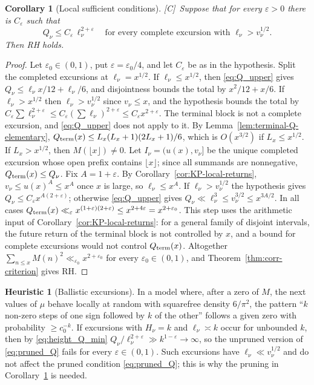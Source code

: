 \documentclass[11pt]{amsart}
\numberwithin{equation}{section}
\theoremstyle{plain}
\newtheorem{corollary}[theorem]{Corollary}
\theoremstyle{definition}
\newtheorem{heuristic}[theorem]{Heuristic}
\theoremstyle{remark}
\newcommand{\eps}{\varepsilon}
\newcommand{\tagC}{\textup{[C]}}
\begin{document}
\begin{corollary}[Local sufficient conditions]
\label{cor:local-corr-sufficient}
\tagC\ Suppose that for every $\eps>0$ there is $C_\eps$ such that
\begin{equation}
\label{eq:pruned_Q}
  Q_\nu\le C_\eps\,\ell_\nu^{2+\eps}\quad\text{for every complete excursion with }
  \ell_\nu>v_\nu^{1/2}.
\end{equation}
Then RH holds.
\end{corollary}

\begin{proof}
Let $\eps_0\in(0,1)$, put $\eps=\eps_0/4$, and let $C_\eps$ be as in the
hypothesis. Split the completed excursions at $\ell_\nu=x^{1/2}$. If
$\ell_\nu\le x^{1/2}$, then \eqref{eq:Q_upper} gives
$Q_\nu\le\ell_\nu x/12+\ell_\nu/6$, and disjointness bounds the total by
$x^2/12+x/6$. If $\ell_\nu>x^{1/2}$ then $\ell_\nu>v_\nu^{1/2}$ since
$v_\nu\le x$, and the hypothesis bounds the total by
$C_\eps\sum\ell_\nu^{2+\eps}\le C_\eps(\sum\ell_\nu)^{2+\eps}\le C_\eps x^{2+\eps}$.
The terminal block is not a complete excursion, and \eqref{eq:Q_upper} does
not apply to it. By Lemma~\ref{lem:terminal-Q-elementary},
$Q_{\rm term}(x)\le L_x(L_x+1)(2L_x+1)/6$, which is $O(x^{3/2})$ if $L_x\le x^{1/2}$. If $L_x>x^{1/2}$, then $M(\lfloor x\rfloor)\ne0$.  Let
$I_\nu=(u(x),v_\nu]$ be the unique completed excursion whose open prefix
contains $\lfloor x\rfloor$; since all summands are nonnegative,
$Q_{\rm term}(x)\le Q_\nu$. Fix $A=1+\eps$. By
Corollary~\ref{cor:KP-local-returns}, $v_\nu\le u(x)^A\le x^A$ once $x$ is
large, so $\ell_\nu\le x^A$. If $\ell_\nu>v_\nu^{1/2}$ the hypothesis gives
$Q_\nu\le C_\eps x^{A(2+\eps)}$; otherwise \eqref{eq:Q_upper} gives
$Q_\nu\ll\ell_\nu^3\le v_\nu^{3/2}\le x^{3A/2}$. In all cases
$Q_{\rm term}(x)\ll_\eps x^{(1+\eps)(2+\eps)}\le x^{2+4\eps}=x^{2+\eps_0}$. This step uses the arithmetic
input of Corollary~\ref{cor:KP-local-returns}: for a general family of
disjoint intervals, the future return of the terminal block is not
controlled by $x$, and a bound for complete excursions would not control
$Q_{\rm term}(x)$. Altogether
$\sum_{n\le x}M(n)^2\ll_{\eps_0}x^{2+\eps_0}$ for every $\eps_0\in(0,1)$,
and Theorem~\ref{thm:corr-criterion} gives RH.
\end{proof}

\begin{heuristic}[Ballistic excursions]
\label{heu:local_fails}
In a model where, after a zero of $M$, the next values of $\mu$ behave
locally at random with squarefree density $6/\pi^2$, the pattern ``$k$
non-zero steps of one sign followed by $k$ of the other'' follows a given
zero with probability $\ge c_0^{-k}$. If excursions with $H_\nu=k$ and
$\ell_\nu\asymp k$ occur for unbounded $k$, then by \eqref{eq:height_Q_min}
$Q_\nu/\ell_\nu^{2+\eps}\gg k^{1-\eps}\to\infty$, so the unpruned version of
\eqref{eq:pruned_Q} fails for every $\eps\in(0,1)$. Such excursions have
$\ell_\nu\ll v_\nu^{1/2}$ and do not affect the pruned condition
\eqref{eq:pruned_Q}; this is why the pruning in
Corollary~\ref{cor:local-corr-sufficient} is needed.
\end{heuristic}
\end{document}
